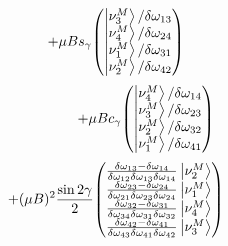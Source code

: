 \documentclass[10pt]{beamer}
\begin{document}
\begin{frame}[noframenumbering]
\begin{minipage}{0.45\textwidth}
\begin{equation*}
            + \mu B s_{\gamma} \mqty(
                    \ket{\nu^{M}_{3}}/\delta \omega_{13} \\
                    \ket{\nu^{M}_{4}}/\delta \omega_{24} \\
                    \ket{\nu^{M}_{1}}/\delta \omega_{31} \\
                    \ket{\nu^{M}_{2}}/\delta \omega_{42})
        \end{equation*}
            \begin{equation*}
            \hspace{1.5cm}+ \mu B c_{\gamma} \mqty(
            \ket{\nu^{M}_{4}}/\delta \omega_{14} \\
            \ket{\nu^{M}_{3}}/\delta \omega_{23} \\
            \ket{\nu^{M}_{2}}/\delta \omega_{32} \\
            \ket{\nu^{M}_{1}}/\delta \omega_{41})
        \end{equation*}
        \begin{equation*}
            + (\mu B)^{2} \frac{\sin 2\gamma}{2} \mqty(\frac{\delta \omega_{13} - 
            \delta \omega_{14}}{\delta \omega_{12} \delta \omega_{13} 
            \delta \omega_{14}} \ket{\nu^{M}_{2}} \\
            \frac{\delta \omega_{23} - \delta \omega_{24}}{\delta \omega_{21} 
            \delta \omega_{23} \delta \omega_{24}} \ket{\nu^{M}_{1}} \\
            \frac{\delta \omega_{32} - \delta \omega_{31}}{\delta \omega_{34} 
            \delta \omega_{31} \delta \omega_{32}} \ket{\nu^{M}_{4}} \\
            \frac{\delta \omega_{42} - \delta \omega_{41}}{\delta \omega_{43} 
            \delta \omega_{41} \delta \omega_{42}} \ket{\nu^{M}_{3}})
        \end{equation*}
        \normalsize
    \end{minipage}
\end{frame}
\end{document}

